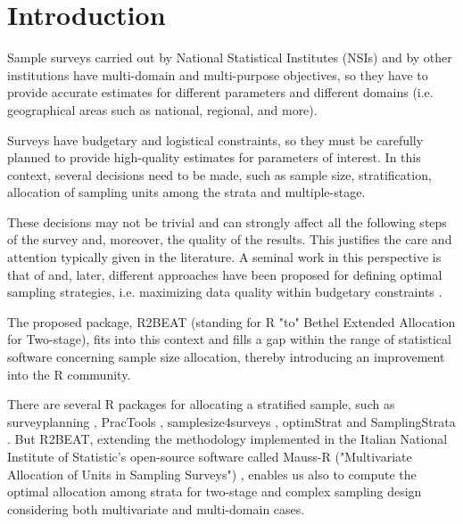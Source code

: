 
\section{Introduction}
Sample surveys carried out by National Statistical Institutes (NSIs) and by other institutions have multi-domain and multi-purpose objectives, so they have to provide accurate estimates for different parameters and different domains (i.e. geographical areas such as national, regional, and more).

Surveys have budgetary and logistical constraints, so they must be carefully planned to provide high-quality estimates for parameters of interest.
In this context, several decisions need to be made, such as sample size, stratification, allocation of sampling units among the strata and multiple-stage.

These decisions may not be trivial and can strongly affect all the following steps of the survey and, moreover, the quality of the results.
This justifies the care and attention typically given in the literature.
A seminal work in this perspective is that of \citet{kish1965survey} and, later, different approaches have been proposed for defining optimal sampling strategies, i.e. maximizing data quality within budgetary constraints \citep[see among the others][]{cochran1977sampling}. 


The proposed package, R2BEAT (standing for {R} "to" Bethel Extended Allocation for Two-stage), fits into this context and fills a gap within the range of statistical software concerning sample size allocation, thereby introducing an improvement into the R community. 

There are several {R} packages for allocating a stratified sample, such as {surveyplanning} \citep{surveyplanning}, {PracTools} \citep{practools}, {samplesize4surveys} \citep{Rojas:2020}, {optimStrat} \citep{optimstrat} and {SamplingStrata} \citep{barcaroli2014samplingstrata}.
But R2BEAT, extending the methodology implemented in the Italian National Institute of Statistic's open-source software called {Mauss-R} ("Multivariate Allocation of Units in Sampling Surveys") \citep{maussr}, enables us also to compute the optimal allocation among strata for two-stage and complex sampling design considering both multivariate and multi-domain cases.

